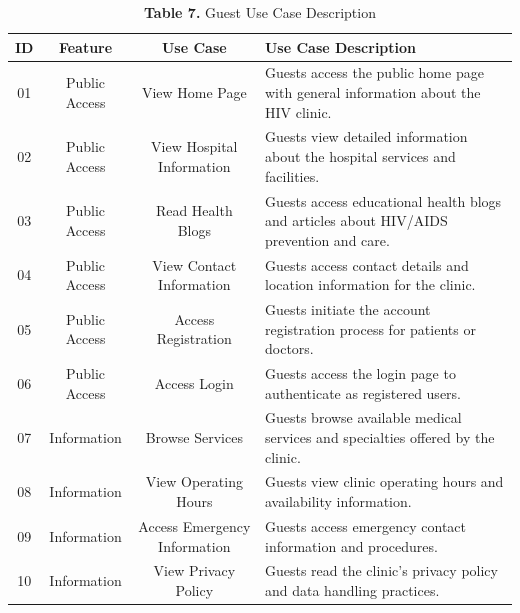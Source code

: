 \documentclass[12pt,a4paper]{article}
\begin{document}
\begin{table}[H]
\centering
\renewcommand{\arraystretch}{1.5}
\begin{tabular}{|c|c|c|p{7.5cm}|}
\hline
\textbf{ID} & \textbf{Feature} & \textbf{Use Case} & \textbf{Use Case Description} \\
\hline
01 & Public Access & View Home Page & Guests access the public home page with general information about the HIV clinic. \\
\hline
02 & Public Access & View Hospital Information & Guests view detailed information about the hospital services and facilities. \\
\hline
03 & Public Access & Read Health Blogs & Guests access educational health blogs and articles about HIV/AIDS prevention and care. \\
\hline
04 & Public Access & View Contact Information & Guests access contact details and location information for the clinic. \\
\hline
05 & Public Access & Access Registration & Guests initiate the account registration process for patients or doctors. \\
\hline
06 & Public Access & Access Login & Guests access the login page to authenticate as registered users. \\
\hline
07 & Information & Browse Services & Guests browse available medical services and specialties offered by the clinic. \\
\hline
08 & Information & View Operating Hours & Guests view clinic operating hours and availability information. \\
\hline
09 & Information & Access Emergency Information & Guests access emergency contact information and procedures. \\
\hline
10 & Information & View Privacy Policy & Guests read the clinic's privacy policy and data handling practices. \\
\hline
\end{tabular}
\caption*{\textbf{Table 7.} Guest Use Case Description}
\label{tab:guest-usecases}
\end{table}
\end{document}
